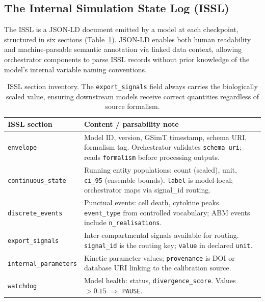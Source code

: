 \documentclass[conference,letterpaper,10pt]{IEEEtran}
\begin{document}
\subsection{The Internal Simulation State Log (ISSL)}\label{sec:issl}
The ISSL is a JSON-LD document emitted by a model at each checkpoint,
structured in six sections (Table~\ref{tab:issl}). JSON-LD enables both
human readability and machine-parsable semantic annotation via linked
data context, allowing orchestrator components to parse ISSL records
without prior knowledge of the model's internal variable naming
conventions.

\begin{table}[t]
\centering
\caption{ISSL section inventory. The \texttt{export\_signals} field
always carries the biologically scaled value, ensuring downstream
models receive correct quantities regardless of source formalism.}
\label{tab:issl}
\renewcommand{\arraystretch}{1.0}
\begin{tabularx}{\columnwidth}{@{}lX@{}}
\toprule
\textbf{ISSL section} & \textbf{Content / parsability note}\\
\midrule
\texttt{envelope}              & Model ID, version, GSimT timestamp, schema URI, formalism tag. Orchestrator validates \texttt{schema\_uri}; reads \texttt{formalism} before processing outputs.\\[1pt]
\texttt{continuous\_state}     & Running entity populations: count (scaled), unit, \texttt{ci\_95} (ensemble bounds). \texttt{label} is model-local; orchestrator maps via signal\_id routing.\\[1pt]
\texttt{discrete\_events}      & Punctual events: cell death, cytokine peaks. \texttt{event\_type} from controlled vocabulary; ABM events include \texttt{n\_realisations}.\\[1pt]
\texttt{export\_signals}       & Inter-compartmental signals available for routing. \texttt{signal\_id} is the routing key; \texttt{value} in declared \texttt{unit}.\\[1pt]
\texttt{internal\_parameters}  & Kinetic parameter values; \texttt{provenance} is DOI or database URI linking to the calibration source.\\[1pt]
\texttt{watchdog}              & Model health: status, \texttt{divergence\_score}. Values $>\!0.15$ $\Rightarrow$ \texttt{PAUSE}.\\
\bottomrule
\end{tabularx}
\end{table}
\end{document}
